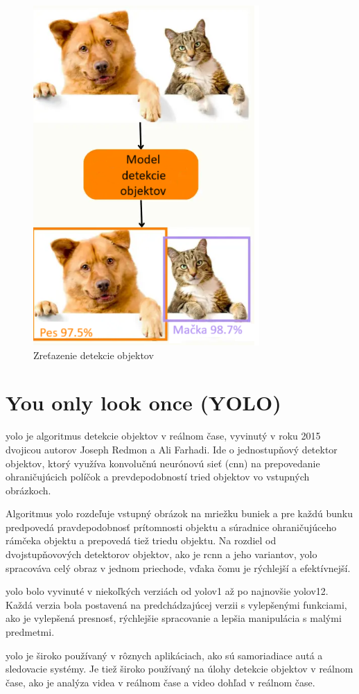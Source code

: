 \begin{figure}[H]
    \centering
    \includegraphics[width=0.45\linewidth]{figures/ODmodel.png}
    \caption{Zreťazenie detekcie objektov \label{ODmodel}}
    \label{fig:enter-label}
\end{figure}

\section{You only look once (YOLO)}

\acrshort{yolo} je algoritmus detekcie objektov v reálnom čase, vyvinutý v roku 2015 dvojicou autorov Joseph Redmon a Ali Farhadi.
Ide o jednostupňový detektor objektov, ktorý využíva konvolučnú neurónovú sieť (\acrshort{cnn}) na prepovedanie ohraničujúcich políčok a prevdepodobností tried objektov vo vstupných obrázkoch.

Algoritmus \acrshort{yolo} rozdeľuje vstupný obrázok na mriežku buniek a pre každú bunku predpovedá pravdepodobnosť prítomnosti objektu a súradnice ohraničujúceho rámčeka objektu a prepovedá tiež triedu objektu.
Na rozdiel od dvojstupňovových detektorov objektov, ako je \acrshort{rcnn} a jeho variantov, \acrshort{yolo} spracováva celý obraz v jednom priechode, vďaka čomu je rýchlejší a efektívnejší.

\acrshort{yolo} bolo vyvinuté v niekoľkých verziách od \acrshort{yolo}v1 až po najnovšie \acrshort{yolo}v12. Každá verzia bola postavená na predchádzajúcej verzii s vylepšenými funkciami, ako je vylepšená presnosť, rýchlejšie spracovanie a lepšia manipulácia s malými predmetmi.

\acrshort{yolo} je široko používaný v rôznych aplikáciach, ako sú samoriadiace autá a sledovacie systémy.
Je tiež široko používaný na úlohy detekcie objektov v reálnom čase, ako je analýza videa v reálnom čase a video dohľad v reálnom čase. \cite{kili}

